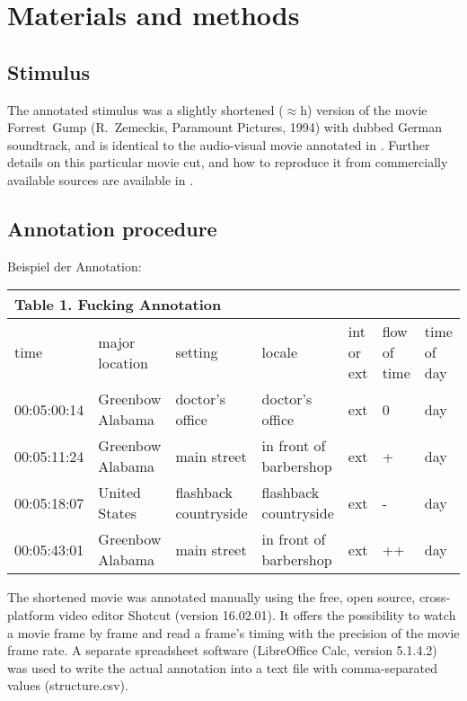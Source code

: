 \documentclass[10pt,a4paper,twocolumn]{article}
\begin{document}
\section*{Materials and methods}

\subsection*{Stimulus}

The annotated stimulus was a slightly shortened ($\approx$\unit[2]{h}) version
of the movie Forrest~Gump (R.~Zemeckis, Paramount Pictures, 1994) with dubbed
German soundtrack, and is identical to the audio-visual movie annotated in
\cite{LRS+2015}. Further details on this particular movie cut, and how to
reproduce it from commercially available sources are available in
\cite{HAK+16}.


\subsection*{Annotation procedure}


Beispiel der Annotation: 
\begin{table}[h]
\begin{tabular}{lllllll}
\multicolumn{7}{l}{Table 1. Fucking Annotation}\tabularnewline
\hline 
time & major location & setting & locale & int or ext & flow of time & time of day\tabularnewline
00:05:00:14  & Greenbow Alabama  & doctor's office  & doctor's office  & ext  & 0 & day\tabularnewline
00:05:11:24  & Greenbow Alabama  & main street  & in front of barbershop  & ext  & + & day\tabularnewline
00:05:18:07  & United States  & flashback countryside  & flashback countryside  & ext  & - & day\tabularnewline
00:05:43:01 & Greenbow Alabama  & main street  & in front of barbershop  & ext  & ++ & day\tabularnewline
\hline 
\end{tabular}
\end{table}


The shortened movie was annotated manually using the free, open source,
cross-platform video editor Shotcut (version 16.02.01). It offers
the possibility to watch a movie frame by frame and read a frame's timing
with the precision of the movie frame rate. A separate spreadsheet
software (LibreOffice Calc, version 5.1.4.2) was used to write the
actual annotation into a text file with comma-separated values (structure.csv). 
\end{document}
